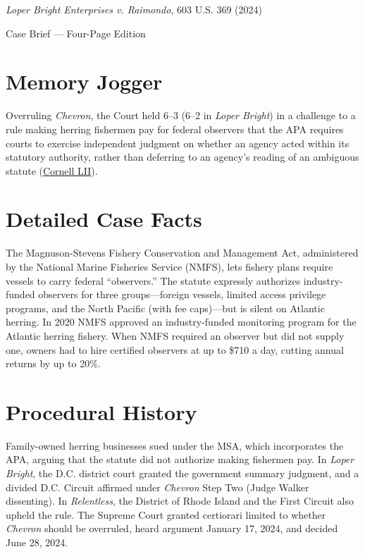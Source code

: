 \documentclass[12pt]{article}
\begin{document}
\begin{center}
{\LARGE \textit{Loper Bright Enterprises v. Raimondo}, 603 U.S. 369 (2024)\par}
\vspace{0.8em}
{\large Case Brief --- Four-Page Edition\par}
\end{center}
\vspace{1em}

\section{Memory Jogger}

Overruling \textit{Chevron}, the Court held 6--3 (6--2 in \textit{Loper Bright}) in a challenge to a rule making herring fishermen pay for federal observers that the APA requires courts to exercise independent judgment on whether an agency acted within its statutory authority, rather than deferring to an agency's reading of an ambiguous statute (\href{https://www.law.cornell.edu/supremecourt/text/22-451}{Cornell LII}).

\section{Detailed Case Facts}

The Magnuson-Stevens Fishery Conservation and Management Act, administered by the National Marine Fisheries Service (NMFS), lets fishery plans require vessels to carry federal ``observers.'' The statute expressly authorizes industry-funded observers for three groups---foreign vessels, limited access privilege programs, and the North Pacific (with fee caps)---but is silent on Atlantic herring. In 2020 NMFS approved an industry-funded monitoring program for the Atlantic herring fishery. When NMFS required an observer but did not supply one, owners had to hire certified observers at up to \$710 a day, cutting annual returns by up to 20\%.

\section{Procedural History}

Family-owned herring businesses sued under the MSA, which incorporates the APA, arguing that the statute did not authorize making fishermen pay. In \textit{Loper Bright}, the D.C. district court granted the government summary judgment, and a divided D.C. Circuit affirmed under \textit{Chevron} Step Two (Judge Walker dissenting). In \textit{Relentless}, the District of Rhode Island and the First Circuit also upheld the rule. The Supreme Court granted certiorari limited to whether \textit{Chevron} should be overruled, heard argument January 17, 2024, and decided June 28, 2024.
\end{document}
